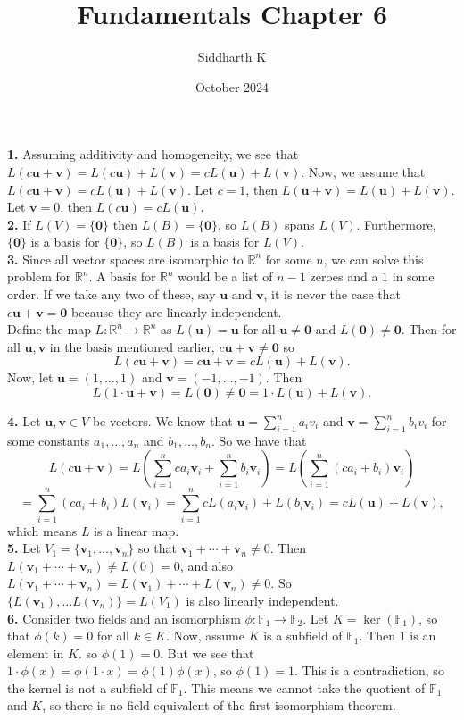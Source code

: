 \documentclass{article}
\title{Fundamentals Chapter 6}
\author{Siddharth K}
\date{October 2024}
\newcommand{\bv}{\mathbf{v}}
\newcommand{\bu}{\mathbf{u}}
\newcommand{\bO}{\mathbf{0}}
\newcommand{\R}{\mathbb{R}}
\newcommand{\F}{\mathbb{F}}
\begin{document}
\maketitle

\textbf{1.} Assuming additivity and homogeneity, we see that $L(c\bu + \bv) = L(c\bu) + L(\bv) = cL(\bu) + L(\bv)$. Now, we assume that $L(c\bu + \bv) = cL(\bu) + L(\bv)$. Let $c = 1$, then $L(\bu + \bv) = L(\bu) + L(\bv)$. Let $\bv = 0$, then $L(c\bu) = cL(\bu)$. \\

\textbf{2.} If $L(V) = \{\bO\}$ then $L(B) = \{\bO\}$, so $L(B)$ spans $L(V)$. Furthermore, $\{\bO\}$ is a basis for $\{\bO\}$, so $L(B)$ is a basis for $L(V)$. \\

\textbf{3.} Since all vector spaces are isomorphic to $\R^n$ for some $n$, we can solve this problem for $\R^n$. A basis for $\R^n$ would be a list of $n - 1$ zeroes and a $1$ in some order. If we take any two of these, say $\bu$ and $\bv$, it is never the case that $c\bu + \bv = \bO$ because they are linearly independent. \\

Define the map $L: \R^n \to \R^n$ as $L(\bu) = \bu$ for all $\bu \neq \bO$ and $L(\bO) \neq \bO$. Then for all $\bu, \bv$ in the basis mentioned earlier, $c\bu + \bv \neq \bO$ so
$$L(c\bu + \bv) = c\bu + \bv = cL(\bu) + L(\bv).$$
Now, let $\bu = (1, \ldots, 1)$ and $\bv = (-1, \ldots, -1)$. Then
$$L(1\cdot \bu + \bv) = L(\bO) \neq \bO = 1\cdot L(\bu) + L(\bv).$$

\textbf{4.} Let $\bu, \bv \in V$ be vectors. We know that $\bu = \sum_{i = 1}^n a_iv_i$ and $\bv = \sum_{i = 1}^n b_iv_i$ for some constants $a_1, \ldots, a_n$ and $b_1, \ldots, b_n$. So we have that
$$L(c\bu + \bv) = L\left(\sum_{i = 1}^n ca_i\bv_i + \sum_{i = 1}^n b_i\bv_i\right) = L\left(\sum_{i = 1}^n (ca_i + b_i)\bv_i\right)$$
$$= \sum_{i = 1}^n (ca_i + b_i)L(\bv_i) = \sum_{i = 1}^n cL(a_i\bv_i) + L(b_i\bv_i) = cL(\bu) + L(\bv),$$
which means $L$ is a linear map. \\

\textbf{5.} Let $V_1 = \{\bv_1, \ldots, \bv_n\}$ so that $\bv_1 + \cdots + \bv_n \neq 0$. Then $L(\bv_1 + \cdots + \bv_n) \neq L(0) = 0$, and also $L(\bv_1 + \cdots + \bv_n) = L(\bv_1) + \cdots + L(\bv_n) \neq 0$. So $\{L(\bv_1), \ldots L(\bv_n)\} = L(V_1)$ is also linearly independent. \\

\textbf{6.} Consider two fields and an isomorphism $\phi: \F_1 \to \F_2$. Let $K = \ker(\F_1)$, so that $\phi(k) = 0$ for all $k \in K$. Now, assume 
$K$ is a subfield of $\F_1$. Then $1$ is an element in $K$. so $\phi(1) = 0$. But we see that $1\cdot \phi(x) = \phi(1\cdot x) = \phi(1)\phi(x)$, so $\phi(1) = 1$. This is a contradiction, so the kernel is not a subfield of $\F_1$. This means we cannot take the quotient of $\F_1$ and $K$, so there is no field equivalent of the first isomorphism theorem. \\
\end{document}
